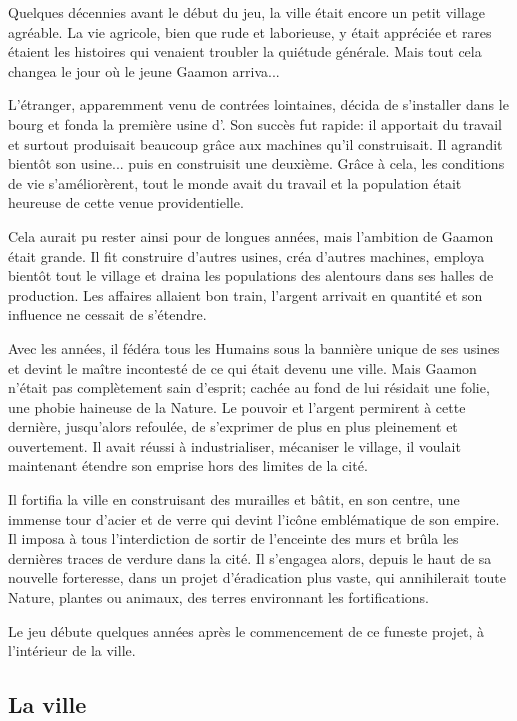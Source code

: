 Quelques décennies avant le début du jeu, la ville était encore un petit village agréable. La vie agricole, bien que rude et laborieuse, y était appréciée et rares étaient les histoires qui venaient troubler la quiétude générale. Mais tout cela changea le jour où le jeune Gaamon arriva...

L'étranger, apparemment venu de contrées lointaines, décida de s'installer dans le bourg et fonda la première usine d'\nomUnivers. Son succès fut rapide: il apportait du travail et surtout produisait beaucoup grâce aux machines qu'il construisait. Il agrandit bientôt son usine... puis en construisit une deuxième. Grâce à cela, les conditions de vie s'améliorèrent, tout le monde avait du travail et la population était heureuse de cette venue providentielle.

Cela aurait pu rester ainsi pour de longues années, mais l'ambition de Gaamon était grande. Il fit construire d'autres usines, créa d'autres machines, employa bientôt tout le village et draina les populations des alentours dans ses halles de production. Les affaires allaient bon train, l'argent arrivait en quantité et son influence ne cessait de s'étendre.

Avec les années, il fédéra tous les Humains sous la bannière unique de ses usines et devint le maître incontesté de ce qui était devenu une ville. Mais Gaamon n'était pas complètement sain d'esprit; cachée au fond de lui résidait une folie, une phobie haineuse de la Nature. Le pouvoir et l'argent permirent à cette dernière, jusqu'alors refoulée, de s'exprimer de plus en plus pleinement et ouvertement. Il avait réussi à industrialiser, mécaniser le village, il voulait maintenant étendre son emprise hors des limites de la cité.

Il fortifia la ville en construisant des murailles et bâtit, en son centre, une immense tour d'acier et de verre qui devint l'icône emblématique de son empire. Il imposa à tous l'interdiction de sortir de l'enceinte des murs et brûla les dernières traces de verdure dans la cité. Il s'engagea alors, depuis le haut de sa nouvelle forteresse, dans un projet d'éradication plus vaste, qui annihilerait toute Nature, plantes ou animaux, des terres environnant les fortifications.

Le jeu débute quelques années après le commencement de ce funeste projet, à l'intérieur de la ville.


\subsection{La ville}

